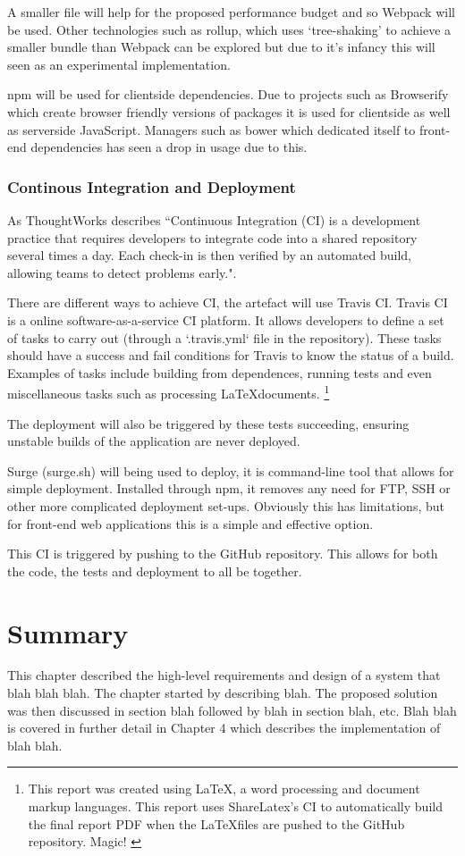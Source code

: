 A smaller file will help for the proposed performance budget and so Webpack will be used. Other technologies such as rollup, which uses `tree-shaking' to achieve a smaller bundle than Webpack can be explored but due to it's infancy this will seen as an experimental implementation. %

npm will be used for clientside dependencies. Due to projects such as Browserify which create browser friendly versions of packages it is used for clientside as well as serverside JavaScript. \cite{browserify} Managers such as bower which dedicated itself to front-end dependencies has seen a drop in usage due to this. \cite{bower}

\subsubsection{Continous Integration and Deployment}

As ThoughtWorks describes ``Continuous Integration (CI) is a development practice that requires developers to integrate code into a shared repository several times a day. Each check-in is then verified by an automated build, allowing teams to detect problems early.". \cite{continuous_integration}

There are different ways to achieve CI, the artefact will use Travis CI. Travis CI is a online software-as-a-service CI platform. It allows developers to define a set of tasks to carry out (through a `.travis.yml` file in the repository). These tasks should have a success and fail conditions for Travis to know the status of a build. Examples of tasks include building from dependences, running tests and even miscellaneous tasks such as processing \LaTeX documents. \footnote{This report was created using \LaTeX, a word processing and document markup languages. \cite{latex} This report uses ShareLatex's CI to automatically build the final report PDF when the \LaTeX files are pushed to the GitHub repository. Magic! \cite{sharelatex}}

The deployment will also be triggered by these tests succeeding, ensuring unstable builds of the application are never deployed.

Surge (surge.sh) will being used to deploy, it is command-line tool that allows for simple deployment. Installed through npm, it removes any need for FTP, SSH or other more complicated deployment set-ups. Obviously this has limitations, but for front-end web applications this is a simple and effective option. \cite{surge}

This CI is triggered by pushing to the GitHub repository. This allows for both the code, the tests and deployment to all be together.

\section{Summary} \label{a-d--summary}

This chapter described the high-level requirements and design of a system that blah blah blah.  The chapter started by describing blah.  The proposed solution was then discussed in section blah followed by blah in section blah, etc.
Blah blah is covered in further detail in Chapter 4 which describes the implementation of blah blah.

